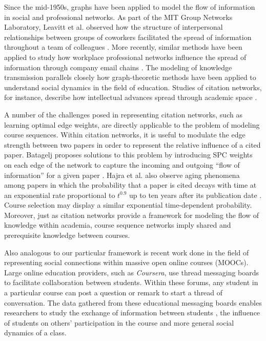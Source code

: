 \documentclass{sigchi}
\begin{document}
Since the mid-1950s, graphs have been applied to model the flow of information in social and professional networks. As part of the MIT Group Networks Laboratory, Leavitt et al. observed how the structure of interpersonal relationships between groups of coworkers facilitated the spread of information throughout a team of colleagues \cite{Leavitt1951}. More recently, similar methods have been applied to study how workplace professional networks influence the spread of information through company email chains \cite{Fisher2004}. The modeling of knowledge transmission parallels closely how graph-theoretic methods have been applied to understand social dynamics in the field of education. Studies of citation networks, for instance, describe how intellectual advances spread through academic space \cite{Batagelj2003, Garfield1964}. 



A number of the challenges posed in representing citation networks, such as learning optimal edge weights, are directly applicable to the problem of modeling course sequences. Within citation networks, it is useful to modulate the edge strength between two papers in order to represent the relative influence of a cited paper. Batagelj proposes solutions to this problem by introducing SPC weights on each edge of the network to capture the incoming and outgoing ``flow of information'' for a given paper \cite{Batagelj2003}. Hajra et al. also observe aging phenomena among papers in which the probability that a paper is cited decays with time at an exponential rate proportional to $t^{0.9}$ up to ten years after its publication date \cite{Hajra2005}. Course selection may display a similar exponential time-dependent probability. Moreover, just as citation networks provide a framework for modeling the flow of knowledge within academia, course sequence networks imply shared and prerequisite knowledge between courses. 

Also analogous to our particular framework is recent work done in the field of representing social connections within massive open online courses (MOOCs). Large online education providers, such as \textit{Coursera}, use thread messaging boards to facilitate collaboration between students. Within these forums, any student in a particular course can post a question or remark to start a thread of conversation. The data gathered from these educational messaging boards enables researchers to study the exchange of information between students \cite{Brinton2016}, the influence of students on others' participation in the course \cite{Sinha2014a} and more general social dynamics of a class.
\end{document}
